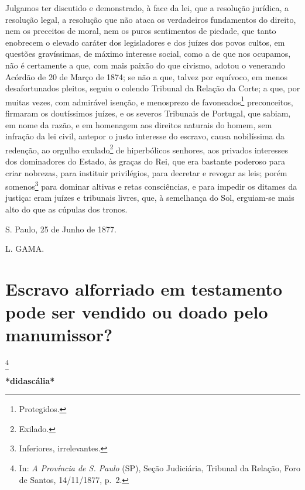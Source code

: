 Julgamos ter discutido e demonstrado, à face da lei, que a resolução
jurídica, a resolução legal, a resolução que não ataca os verdadeiros
fundamentos do direito, nem os preceitos de moral, nem os puros
sentimentos de piedade, que tanto enobrecem o elevado caráter dos
legisladores e dos juízes dos povos cultos, em questões gravíssimas, de
máximo interesse social, como a de que nos ocupamos, não é certamente a
que, com mais paixão do que civismo, adotou o venerando Acórdão de 20 de
Março de 1874; se não a que, talvez por equívoco, em menos
desafortunados pleitos, seguiu o colendo Tribunal da Relação da Corte; a
que, por muitas vezes, com admirável isenção, e menosprezo de
favoneados\footnote{Protegidos.} preconceitos, firmaram os doutíssimos
juízes, e os severos Tribunais de Portugal, que sabiam, em nome da
razão, e em homenagem aos direitos naturais do homem, sem infração da
lei civil, antepor o justo interesse do escravo, causa nobilíssima da
redenção, ao orgulho exulado\footnote{Exilado.} de hiperbólicos
senhores, aos privados interesses dos dominadores do Estado, às graças
do Rei, que era bastante poderoso para criar nobrezas, para instituir
privilégios, para decretar e revogar as leis; porém somenos\footnote{Inferiores,
  irrelevantes.} para dominar altivas e retas consciências, e para
impedir os ditames da justiça: eram juízes e tribunais livres, que, à
semelhança do Sol, erguiam-se mais alto do que as cúpulas dos tronos.

S. Paulo, 25 de Junho de 1877.

L. GAMA.

\chapter{Escravo alforriado em testamento pode ser vendido ou doado
pelo manumissor?} %

\footnote{In: \emph{A Província de S. Paulo} (SP), Seção Judiciária,
  Tribunal da Relação, Foro de Santos, 14/11/1877, p.~2.}

\textbf{*didascália*}

